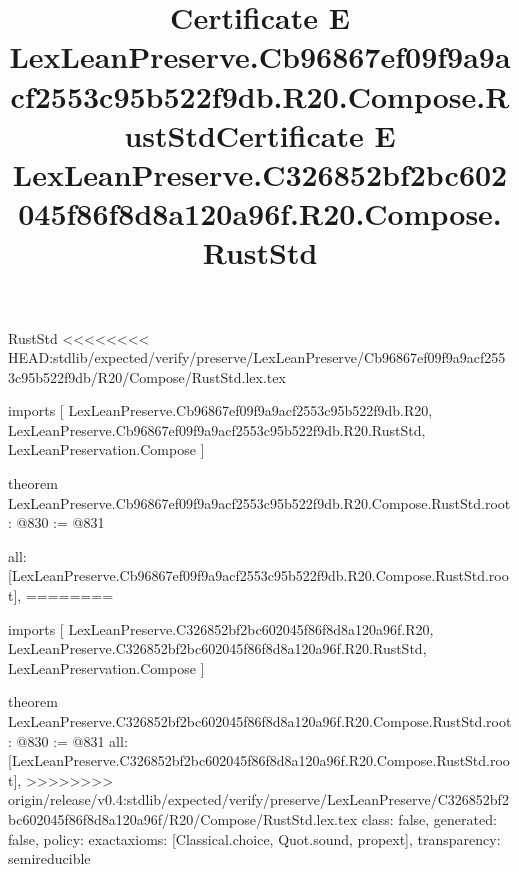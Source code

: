 \begin{lexlean}{RustStd}
<<<<<<<< HEAD:stdlib/expected/verify/preserve/LexLeanPreserve/Cb96867ef09f9a9acf2553c95b522f9db/R20/Compose/RustStd.lex.tex
\title{Certificate E LexLeanPreserve.Cb96867ef09f9a9acf2553c95b522f9db.R20.Compose.RustStd}
\begin{coremodule}
imports [
  LexLeanPreserve.Cb96867ef09f9a9acf2553c95b522f9db.R20,
  LexLeanPreserve.Cb96867ef09f9a9acf2553c95b522f9db.R20.RustStd,
  LexLeanPreservation.Compose
]

theorem LexLeanPreserve.Cb96867ef09f9a9acf2553c95b522f9db.R20.Compose.RustStd.root : @830 := @831 {
  all: [LexLeanPreserve.Cb96867ef09f9a9acf2553c95b522f9db.R20.Compose.RustStd.root],
========
\title{Certificate E LexLeanPreserve.C326852bf2bc602045f86f8d8a120a96f.R20.Compose.RustStd}
\begin{coremodule}
imports [
  LexLeanPreserve.C326852bf2bc602045f86f8d8a120a96f.R20,
  LexLeanPreserve.C326852bf2bc602045f86f8d8a120a96f.R20.RustStd,
  LexLeanPreservation.Compose
]

theorem LexLeanPreserve.C326852bf2bc602045f86f8d8a120a96f.R20.Compose.RustStd.root : @830 := @831 {
  all: [LexLeanPreserve.C326852bf2bc602045f86f8d8a120a96f.R20.Compose.RustStd.root],
>>>>>>>> origin/release/v0.4:stdlib/expected/verify/preserve/LexLeanPreserve/C326852bf2bc602045f86f8d8a120a96f/R20/Compose/RustStd.lex.tex
  class: false,
  generated: false,
  policy: exact{axioms: [Classical.choice, Quot.sound, propext]},
  transparency: semireducible
}


\end{coremodule}}
\end{coremodule}
\end{lexlean}

